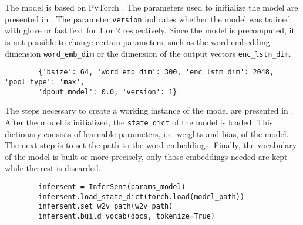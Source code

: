 \section{\infersent{}}\label{sec:impl-infersent}

The \infersent{} model is based on PyTorch \cite{HfsentTrans2019}.
The parameters used to initialize the model are presented in .
The parameter \texttt{version} indicates whether the model was trained with \acs{glove} or fastText for 1 or 2 respectively.
Since the model is precomputed, it is not possible to change certain parameters, 
such as the word embedding dimension \texttt{word\_emb\_dim} or the dimension of the output vectors \texttt{enc\_lstm\_dim}.

\begin{listing}[htp]
    \begin{verbatim}
        {'bsize': 64, 'word_emb_dim': 300, 'enc_lstm_dim': 2048, 'pool_type': 'max', 
        'dpout_model': 0.0, 'version': 1}
    \end{verbatim}
    \caption{Parameters of the \infersent{} model.
    }
    \label{lst:infersent-params}
\end{listing}

The steps necessary to create a working instance of the \infersent{} model are presented in .
After the \infersent{} model is initialized, the \texttt{state\_dict} of the model is loaded.
This dictionary consists of learnable parameters, i.e. weights and bias, of the model.
The next step is to set the path to the word embeddings.
Finally, the vocabulary of the model is built or more precisely, only those embeddings needed are kept while the rest is discarded.

\begin{listing}[htp]
    \begin{verbatim}
        infersent = InferSent(params_model)
        infersent.load_state_dict(torch.load(model_path))
        infersent.set_w2v_path(w2v_path)
        infersent.build_vocab(docs, tokenize=True)
    \end{verbatim}
    \caption{Initializing the \infersent{} model.
    }
    \label{lst:infersent-init}
\end{listing}

